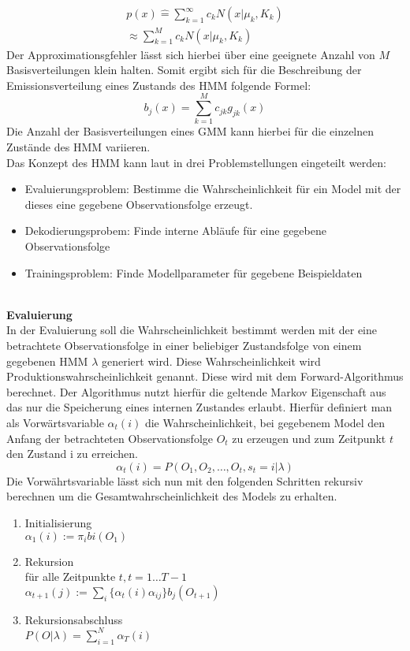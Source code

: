 \begin{multline}
p(x) \hat{=} \sum_{k=1}^\infty c_{k} N(x|\mu_{k},K_{k})\\
\approx \sum_{k=1}^M c_{k} N(x|\mu_{k},K_{k})  
\end{multline}
Der Approximationsgfehler lässt sich hierbei über eine geeignete Anzahl von
\(M\) Basisverteilungen klein halten. Somit ergibt sich für die Beschreibung der
Emissionsverteilung eines Zustands des \acl{HMM} folgende Formel:
\begin{equation}
b_{j}(x) = \sum_{k=1}^M c_{jk}g_{jk}(x)
\end{equation}
Die Anzahl der Basisverteilungen eines \acl{GMM} kann hierbei für die einzelnen
Zustände des HMM variieren.\\

Das Konzept des \acl{HMM} kann laut \cite{rabiner} in drei Problemstellungen eingeteilt werden:
\begin{itemize}
  \item Evaluierungsproblem: Bestimme die Wahrscheinlichkeit für ein Model mit
  der dieses eine gegebene Observationsfolge erzeugt.
  \item Dekodierungsprobem: Finde interne Abläufe für eine gegebene Observationsfolge
  \item Trainingsproblem: Finde Modellparameter für gegebene Beispieldaten
\end{itemize}
\\
\textbf{Evaluierung} \\
In der Evaluierung soll die Wahrscheinlichkeit bestimmt werden mit der eine
betrachtete Observationsfolge in einer beliebiger Zustandsfolge von einem
gegebenen \acl{HMM} \(\lambda\) generiert wird. Diese Wahrscheinlichkeit wird
Produktionswahrscheinlichkeit genannt. Diese wird mit dem Forward-Algorithmus
berechnet. Der Algorithmus nutzt hierfür die geltende Markov Eigenschaft
aus das nur die Speicherung eines internen Zustandes erlaubt. Hierfür definiert
man als Vorwärtsvariable \(\alpha_{t}(i)\) die Wahrscheinlichkeit, bei
gegebenem Model \lampda den Anfang der betrachteten Observationsfolge \(O_{t}\)
zu erzeugen und zum Zeitpunkt \(t\) den Zustand i zu erreichen.
\begin{equation}
\alpha_{t}(i) = P(O_{1},O_{2},\ldots,O_{t},s_{t}=i|\lambda)
\end{equation}
Die Vorwährtsvariable lässt sich nun mit den folgenden Schritten rekursiv
berechnen um die Gesamtwahrscheinlichkeit des Models zu erhalten.
\begin{enumerate}
  \item Initialisierung\\
		$\alpha_{1}(i) := \pi_{i}b{i}(O_{1})$
  \item Rekursion\\
	für alle Zeitpunkte \(t, t=1 \ldots T-1\)\\
	\(\alpha_{t+1}(j) :=
	\sum\limits_{i}\{\alpha_{t}(i)\alpha_{ij}\}b_{j}(O_{t+1})\)
  \item Rekursionsabschluss\\
  	\(P(O|\lambda) = \sum\limits_{i=1}^N \alpha_{T}(i)\)
\end{enumerate}


